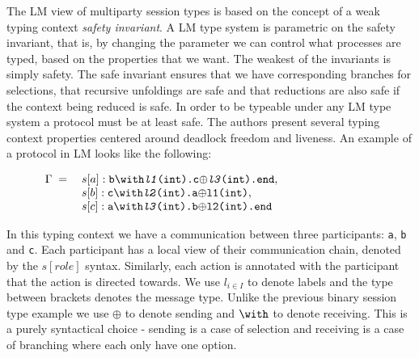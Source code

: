 \documentclass{article}
\newcommand{\type}[1]{\texttt{#1}}
\begin{document}
The LM view of multiparty session types is based on the concept of a weak typing context \textit{safety invariant}.
A LM type system is parametric on the safety invariant, that is, by changing the parameter we can control what processes are typed, based on the properties that we want.
The weakest of the invariants is simply safety.
The safe invariant ensures that we have corresponding branches for selections, that recursive unfoldings are safe and that reductions are also safe if the context being reduced is safe.
In order to be typeable under any LM type system a protocol must be at least safe.
The authors present several typing context properties centered around deadlock freedom and liveness.
An example of a protocol in LM looks like the following:

\begin{figure}[H]
    \centering
$
    \begin{array}{rl}
        \textbf{\ensuremath{\Gamma}} \; = \;  & s[a]:\type{b\ensuremath{\with}\textit{l1}(int).c\ensuremath{\oplus}\textit{l3}(int).end}, \cr
        & s[b]:\type{c\ensuremath{\with}\textit{l2}(int).a\ensuremath{\oplus}l1(int)}, \cr
        & s[c]:\type{a\ensuremath{\with}\textit{l3}(int).b\ensuremath{\oplus}l2(int).end}
    \end{array}
$
\end{figure}

In this typing context we have a communication between three participants: \type{a}, \type{b} and \type{c}.
Each participant has a local view of their communication chain, denoted by the \ensuremath{s[role]} syntax.
Similarly, each action is annotated with the participant that the action is directed towards.
We use \ensuremath{l_{i \in I}} to denote labels and the type between brackets denotes the message type.
Unlike the previous binary session type example we use \type{\ensuremath{\oplus}} to denote sending and \type{\ensuremath{\with}} to denote receiving.
This is a purely syntactical choice - sending is a case of selection and receiving is a case of branching where each only have one option.
\end{document}
